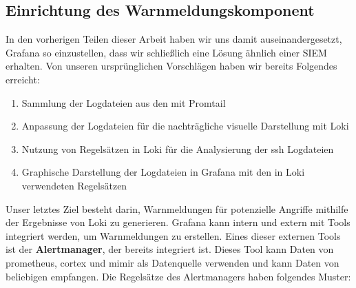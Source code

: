 \subsection{Einrichtung des Warnmeldungskomponent}
In den vorherigen Teilen dieser Arbeit haben wir uns damit auseinandergesetzt, Grafana so einzustellen, dass wir schließlich eine Lösung ähnlich einer \gls{SIEM} erhalten. Von unseren ursprünglichen Vorschlägen haben wir bereits Folgendes erreicht:


{
\begin{enumerate}[noitemsep]
   \item	Sammlung der Logdateien aus den  mit Promtail
   \item Anpassung der Logdateien für die nachträgliche visuelle Darstellung mit Loki
   \item Nutzung von Regelsätzen in Loki für die Analysierung der \gls{ssh} Logdateien
   \item Graphische Darstellung der Logdateien in Grafana mit den in Loki verwendeten Regelsätzen
\end{enumerate}
}
Unser letztes Ziel besteht darin, Warnmeldungen für potenzielle Angriffe mithilfe der Ergebnisse von Loki zu generieren. Grafana kann intern und extern mit Tools integriert werden, um Warnmeldungen zu erstellen. Eines dieser externen Tools ist der \textbf{Alertmanager}, der bereits integriert ist. Dieses Tool kann Daten von \gls{prometheus}, \gls{cortex} und \gls{mimir} als Datenquelle verwenden \citep{Grafana_Alertmanager} und kann Daten von beliebigen  empfangen. Die Regelsätze des Alertmanagers haben folgendes Muster:


